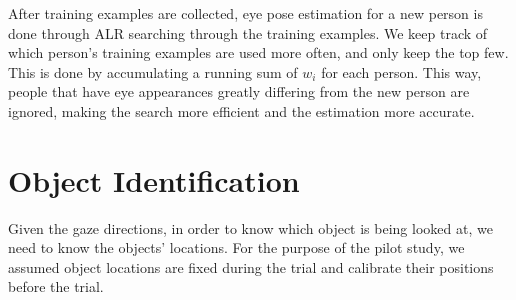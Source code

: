 \documentclass{ut-thesis}
\begin{document}
After training examples are collected, eye pose estimation for a new person is done through ALR searching through the training examples.  We keep track of which person's training examples are used more often, and only keep the top few.  This is done by accumulating a running sum of \(w_i\) for each person.  This way, people that have eye appearances greatly differing from the new person are ignored, making the search more efficient and the estimation more accurate.
\section{Object Identification}
Given the gaze directions, in order to know which object is being looked at, we need to know the objects' locations.  For the purpose of the pilot study, we assumed object locations are fixed during the trial and calibrate their positions before the trial.
\end{document}
